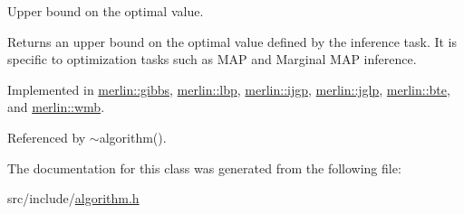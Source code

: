 Upper bound on the optimal value. 

\begin{DoxyReturn}{Returns}
an upper bound on the optimal value defined by the inference task. It is specific to optimization tasks such as M\+AP and Marginal M\+AP inference. 
\end{DoxyReturn}


Implemented in \hyperlink{classmerlin_1_1gibbs_ac433bf8d912355ed96f4d2299f8d71d9}{merlin\+::gibbs}, \hyperlink{classmerlin_1_1lbp_a6f47094c1dd1b721c8b55b2a104bf708}{merlin\+::lbp}, \hyperlink{classmerlin_1_1ijgp_aa5813f62d79f2a2c2fcdb24cbc967040}{merlin\+::ijgp}, \hyperlink{classmerlin_1_1jglp_aeb00e60c9df427722f2ff791bdd056d9}{merlin\+::jglp}, \hyperlink{classmerlin_1_1bte_a8855426f65d43e799053282369728736}{merlin\+::bte}, and \hyperlink{classmerlin_1_1wmb_a78d08bbf18835324d79a4f73eebeecc7}{merlin\+::wmb}.



Referenced by $\sim$algorithm().



The documentation for this class was generated from the following file\+:\begin{DoxyCompactItemize}
\item 
src/include/\hyperlink{algorithm_8h}{algorithm.\+h}\end{DoxyCompactItemize}
